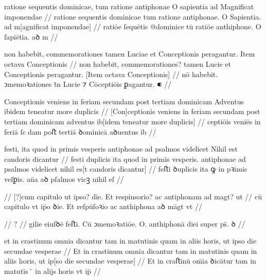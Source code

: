 \ex \bg
\gla
{}
ratione sequentis dominicae, tum
ratione antiphonae O sapientia ad Magnificat imponendae
//
\glRekonstrukcja
{}
ratione sequentis dominicae tum
ratione antiphonae. O Sapientia. ad m[agnificat imponendae]
//
\glU
{}
ratiōe ſequētis @dominice tū ratiōe anthiphone. O ſapiētia. aꝺ m 
//
\endgl
\xe



\ex \bg
\gla
{}
non habebit,
commemorationes tamen Luciae et Conceptionis peragantur.
Item octava Conceptionis
//
\glRekonstrukcja
{}
non habebit,
commemorationes? tamen Lucie et Conceptionis peragantur.
[Item octava Conceptionis]
//
\glU
{}
nō habebit. ↄmemoꝛationes t̄n Lucie ⁊ Cōceptiōis ꝑagantur. ⁌   
//
\endgl
\xe



\ex \bg
\gla
{}
Conceptionis veniens in feriam secundam post tertiam dominicam Adventus ibidem teneatur more duplicis
//
\glRekonstrukcja
{}
[Con]ceptionis veniens in feriam secundam post tertiam dominicam adventus ib[idem teneatur more duplicis]
//
\glU
{}
ceptiōis veniēs in feriā ſcdam poﬅ tertiā ꝺominicā aꝺuentus ib   
//
\endgl
\xe



\ex \bg
\gla
{}
festi, {} ita quod
in primis vesperis antiphonae ad psalmos videlicet Nihil est candoris
dicantur
//
\glRekonstrukcja
{}
festi duplicis ita quod
in primis vesperis. antiphonae ad psalmos videlicet nihil es[t candoris
dicantur]
//
\glU
{}
feﬅi ꝺuplicis ita ꝙ in pꝛimis veſꝑis. an̄a aꝺ pſalmos vicꝫ nihil eſ  
//
\endgl
\xe


\ex \bg
\gla
{}
{} {} {} {} {} {} {} {} {} {}
{} {} {} {} {} {} {} {} {} {}
//
\glRekonstrukcja
{}
[?]cum capitulo ut ipso? die. Et respinsorio? ac antiphonam ad magt? ut
//
\glU
{}
cū capitulo vt ip̄o ꝺie. Et reſpūſoꝛio ac anthiphona aꝺ māgt vt 
//
\endgl
\xe




\ex \bg
\gla
{}
{} {} {} {} {} {} {} {} {} {}
{} {} {} {} {} {} {} {} {} {}
//
\glRekonstrukcja
?
//
\glU
{}
gilie eiuſꝺē feﬅi. Cū ↄmemoꝛatiōe. O. anthiphonā diei super ps̈. ꝺ
//
\endgl
\xe



\ex \bg
\gla
{}
et in crastinum omnia dicantur tam in matutinis
quam in aliis horis, ut ipso die secundae vesperae 
//
\glRekonstrukcja
{}
Et in crastinum omnia dicantur tam in matutinis
quam in aliis horis, ut ip[so die secundae vesperae]
//
\glU
{}
Et in craﬅinū om̄ia ꝺicātur tam in matutīs ̈ in alijs horis vt ip̄   
//
\endgl
\xe


